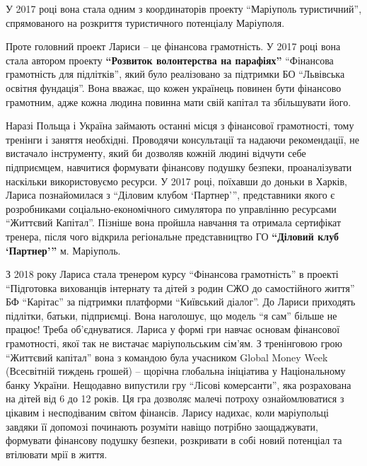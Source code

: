 
У 2017 році вона стала одним з координаторів проекту \enquote{Маріуполь туристичний},
спрямованого на розкриття туристичного потенціалу Маріуполя.


Проте головний проект Лариси – це фінансова грамотність. У 2017 році вона стала
автором проекту \textbf{\enquote{Розвиток волонтерства на парафіях}} \enquote{Фінансова грамотність для
підлітків}, який було реалізовано за підтримки БО \enquote{Львівська освітня фундація}.
Вона вважає, що кожен українець повинен бути фінансово грамотним, адже кожна
людина повинна мати свій капітал та збільшувати його.

Наразі Польща і Україна займають останні місця з фінансової грамотності, тому
тренінги і заняття необхідні. Проводячи консультації та надаючи рекомендації,
не вистачало інструменту, який би дозволяв кожній людині відчути себе
підприємцем, навчитися формувати фінансову подушку безпеки, проаналізувати
наскільки використовуємо ресурси. У 2017 році, поїхавши до доньки в Харків,
Лариса познайомилася з \enquote{Діловим клубом \enquote{Партнер}}, представники якого є
розробниками соціально-економічного симулятора по управлінню ресурсами
\enquote{Життєвий Капітал}. Пізніше вона пройшла навчання та отримала сертифікат
тренера, після чого відкрила регіональне представництво ГО \textbf{\enquote{Діловий клуб
\enquote{Партнер}}} м. Маріуполь.


З 2018 року Лариса стала тренером курсу \enquote{Фінансова грамотність} в проекті
\enquote{Підготовка вихованців інтернату та дітей з родин СЖО до самостійного життя} БФ
\enquote{Карітас} за підтримки платформи \enquote{Київський діалог}. До Лариси приходять
підлітки, батьки, підприємці. Вона наголошує, що модель \enquote{я сам} більше не
працює! Треба об'єднуватися. Лариса у формі гри навчає основам фінансової
грамотності, якої так не вистачає маріупольським сім'ям. З тренінговою грою
\enquote{Життєвий капітал} вона з командою була учасником Global Money Week (Всесвітній
тиждень грошей) – щорічна глобальна ініціатива у Національному банку України.
Нещодавно випустили гру \enquote{Лісові комерсанти}, яка розрахована на дітей від 6 до
12 років. Ця гра дозволяє малечі потроху ознайомлюватися з цікавим і
несподіваним світом фінансів. Ларису надихає, коли маріупольці завдяки її
допомозі починають розуміти навіщо потрібно заощаджувати, формувати фінансову
подушку безпеки, розкривати в собі новий потенціал та втілювати мрії в життя.

